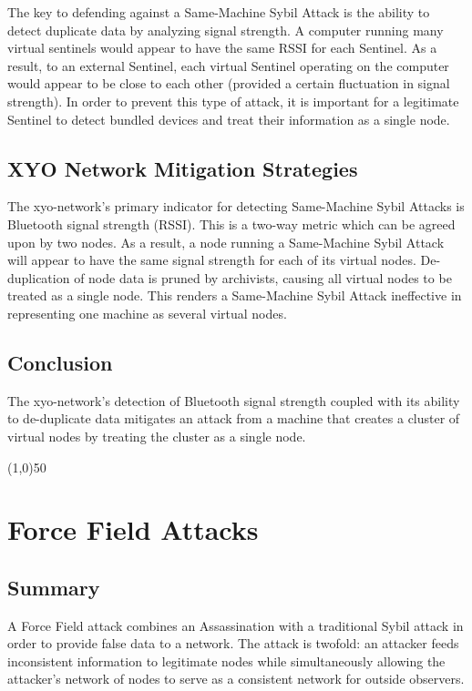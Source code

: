 \documentclass{article}
\begin{document}
The key to defending against a Same-Machine Sybil Attack is the ability to detect duplicate data by analyzing signal strength. A computer running many virtual \Glspl{sentinel} would appear to have the same RSSI for each Sentinel. As a result, to an external Sentinel, each virtual Sentinel operating on the computer would appear to be close to each other (provided a certain fluctuation in signal strength). In order to prevent this type of attack, it is important for a legitimate Sentinel to detect bundled devices and treat their information as a single node.

\subsection{XYO Network Mitigation Strategies}

The \Gls{xyo-network}'s primary indicator for detecting Same-Machine Sybil Attacks is Bluetooth signal strength (RSSI). This is a two-way metric which can be agreed upon by two nodes. As a result, a node running a Same-Machine Sybil Attack will appear to have the same signal strength for each of its virtual nodes. De-duplication of node data is pruned by \Glspl{archivist}, causing all virtual nodes to be treated as a single node. This renders a Same-Machine Sybil Attack ineffective in representing one machine as several virtual nodes.

\subsection{Conclusion}

The \Gls{xyo-network}'s detection of Bluetooth signal strength coupled with its ability to de-duplicate data mitigates an attack from a machine that creates a cluster of virtual nodes by treating the cluster as a single node.

\begin{center}
\line(1,0){50}
\end{center}

\section{Force Field Attacks}
\subsection{Summary}
A Force Field attack combines an Assassination with a traditional Sybil attack in order to provide false data to a network. The attack is twofold: an attacker feeds inconsistent information to legitimate nodes while simultaneously allowing the attacker's network of nodes to serve as a consistent network for outside observers.
\end{document}
